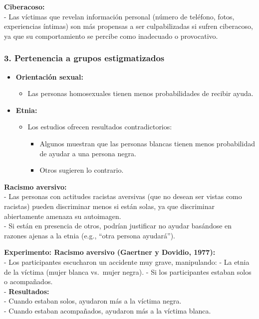 \documentclass[
]{book}
\providecommand{\tightlist}{%
  \setlength{\itemsep}{0pt}\setlength{\parskip}{0pt}}
\begin{document}
\textbf{Ciberacoso:}\\
- Las víctimas que revelan información personal (número de teléfono, fotos, experiencias íntimas) son más propensas a ser culpabilizadas si sufren ciberacoso, ya que su comportamiento se percibe como inadecuado o provocativo.

\subsubsection{\texorpdfstring{3. \textbf{Pertenencia a grupos estigmatizados}}{3. Pertenencia a grupos estigmatizados}}\label{pertenencia-a-grupos-estigmatizados}

\begin{itemize}
\tightlist
\item
  \textbf{Orientación sexual:}

  \begin{itemize}
  \tightlist
  \item
    Las personas homosexuales tienen menos probabilidades de recibir ayuda.
  \end{itemize}
\item
  \textbf{Etnia:}

  \begin{itemize}
  \tightlist
  \item
    Los estudios ofrecen resultados contradictorios:

    \begin{itemize}
    \tightlist
    \item
      Algunos muestran que las personas blancas tienen menos probabilidad de ayudar a una persona negra.
    \item
      Otros sugieren lo contrario.
    \end{itemize}
  \end{itemize}
\end{itemize}

\textbf{Racismo aversivo:}\\
- Las personas con actitudes racistas aversivas (que no desean ser vistas como racistas) pueden discriminar menos si están solas, ya que discriminar abiertamente amenaza su autoimagen.\\
- Si están en presencia de otros, podrían justificar no ayudar basándose en razones ajenas a la etnia (e.g., ``otra persona ayudará'').

\textbf{Experimento: Racismo aversivo (Gaertner y Dovidio, 1977):}\\
- Los participantes escucharon un accidente muy grave, manipulando:
- La etnia de la víctima (mujer blanca vs.~mujer negra).
- Si los participantes estaban solos o acompañados.\\
- \textbf{Resultados:}\\
- Cuando estaban solos, ayudaron más a la víctima negra.\\
- Cuando estaban acompañados, ayudaron más a la víctima blanca.
\end{document}

